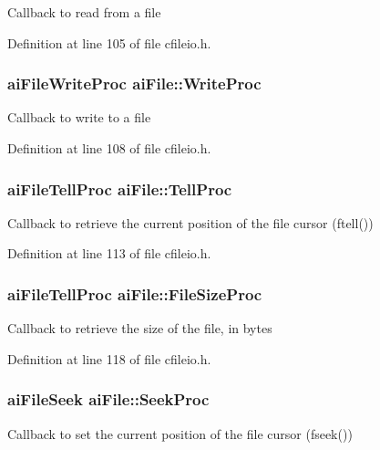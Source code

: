 Callback to read from a file 

Definition at line 105 of file cfileio.h.\hypertarget{structai_file_b9fca3a62e34a33592c13a6f31db7d1d}{
\subsubsection[WriteProc]{\setlength{\rightskip}{0pt plus 5cm}aiFileWriteProc {\bf aiFile::WriteProc}}}
\label{structai_file_b9fca3a62e34a33592c13a6f31db7d1d}


Callback to write to a file 

Definition at line 108 of file cfileio.h.\hypertarget{structai_file_af2d88a3b2fcbdacf51119658283d27e}{
\subsubsection[TellProc]{\setlength{\rightskip}{0pt plus 5cm}aiFileTellProc {\bf aiFile::TellProc}}}
\label{structai_file_af2d88a3b2fcbdacf51119658283d27e}


Callback to retrieve the current position of the file cursor (ftell()) 

Definition at line 113 of file cfileio.h.\hypertarget{structai_file_ff2fff8c0458e7ec71f7de217c3a3033}{
\subsubsection[FileSizeProc]{\setlength{\rightskip}{0pt plus 5cm}aiFileTellProc {\bf aiFile::FileSizeProc}}}
\label{structai_file_ff2fff8c0458e7ec71f7de217c3a3033}


Callback to retrieve the size of the file, in bytes 

Definition at line 118 of file cfileio.h.\hypertarget{structai_file_7a07b499be4ad433669246479a4d4ad2}{
\subsubsection[SeekProc]{\setlength{\rightskip}{0pt plus 5cm}aiFileSeek {\bf aiFile::SeekProc}}}
\label{structai_file_7a07b499be4ad433669246479a4d4ad2}


Callback to set the current position of the file cursor (fseek()) 

